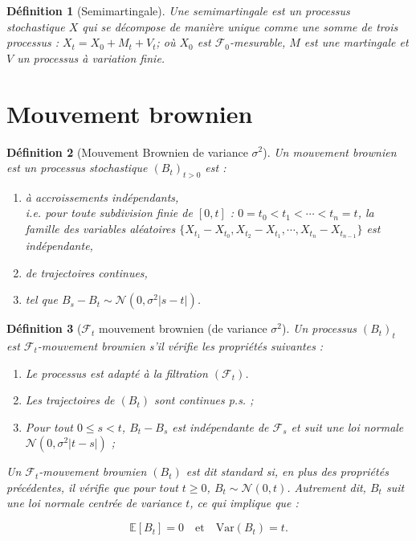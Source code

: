 \documentclass[openany]{book}
\newcommand{\F}{\mathscr{F}}
\newcommand{\1}{\mathbbm{1}}
\theoremstyle{thmfont}
\theoremstyle{deffont}
\newtheorem{definition}[definition]{Définition}
\theoremstyle{thmfont}
\theoremstyle{deffont}
\begin{document}
\begin{definition}[Semimartingale] Une \textit{semimartingale} est un processus stochastique $X$ qui se décompose de manière unique comme une somme de trois processus : $X_t = X_0+ M_t + V_t$; où $X_0$ est $\F_0$-mesurable, $M$ est une martingale et $V$ un processus à variation finie.
\end{definition}

\section{Mouvement brownien}

\begin{definition}[Mouvement Brownien de variance $\sigma^2$] Un \textit{mouvement brownien} est un processus stochastique $(B_t)_{t>0}$ est :
  \begin{enumerate}
  \item à accroissements indépendants,\\
    i.e. pour toute subdivision finie de $[0,t]$ :  $0 = t_0 < t_1 < \cdots < t_n = t$, la famille des variables aléatoires
    $\{X_{t_1} - X_{t_0}, X_{t_2} - X_{t_1}, \cdots ,X_{t_n} - X_{t_{n-1}}\}$
    est indépendante,
  \item de trajectoires continues,
  \item tel que $B_s - B_t \sim \mathcal{N}(0,\sigma^2|s-t|)$.
  \end{enumerate}
\end{definition}

\begin{definition}[$\F_t$ mouvement brownien (de variance $\sigma^2$] Un processus $(B_t)_t$ est \textit{\( \mathcal{F}_t \)-mouvement brownien} s'il vérifie les propriétés suivantes :

  \begin{enumerate}
  \item Le processus est adapté à la filtration \( (\mathcal{F}_t) \).
  \item Les trajectoires de \( (B_t) \) sont continues p.s. ;
  \item Pour tout \( 0 \leq s < t \), \( B_t - B_s \) est indépendante de \( \mathcal{F}_s \) et suit une loi normale \( \mathcal{N}(0, \sigma^2|t - s|)\) ;
  \end{enumerate}

  Un \( \mathcal{F}_t \)-mouvement brownien \( (B_t) \) est dit \textit{standard} si, en plus des propriétés précédentes, il vérifie que pour tout \( t \geq 0 \), \(B_t \sim \mathcal{N}(0, t) \).
Autrement dit, \( B_t \) suit une loi normale centrée de variance \( t \), ce qui implique que :

\[
\mathbb{E}[B_t] = 0 \quad \text{et} \quad \text{Var}(B_t) = t.
\]
\end{definition}
\end{document}
